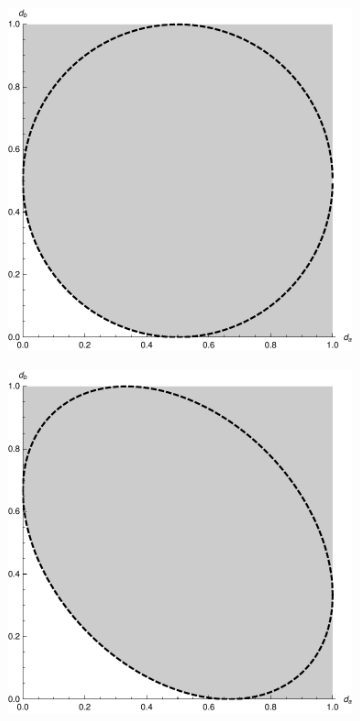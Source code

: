 \begin{figure}
  \begin{center}
    \begin{subfigure}[t]{0.4\textwidth}
      \includegraphics[width=\textwidth]{fourier-ur-2}
    \end{subfigure}\quad
    \begin{subfigure}[t]{0.4\textwidth}
      \includegraphics[width=\textwidth]{fourier-ur-3}

\end{subfigure}
\end{center}
\end{figure}
